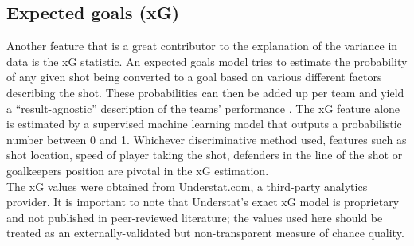 \documentclass{article}
\begin{document}
\subsection{Expected goals (xG)}
Another feature that is a great contributor to the explanation of the variance in data is the xG statistic. An expected goals model tries to estimate the probability of any given shot being converted to a goal based on various different factors describing the shot. These probabilities can then be added up per team and yield a “result-agnostic” description of the teams' performance \cite{xG}. The xG feature alone is estimated by a supervised machine learning model that outputs a probabilistic number between 0 and 1. Whichever discriminative method used, features such as shot location, speed of player taking the shot, defenders in the line of the shot or goalkeepers position are pivotal in the xG estimation.
\\
The xG values were obtained from Understat.com, a third-party analytics provider. It is important to note that Understat's exact xG model is proprietary and not published in peer-reviewed literature; the values used here should be treated as an externally-validated but non-transparent measure of chance quality.
\end{document}
